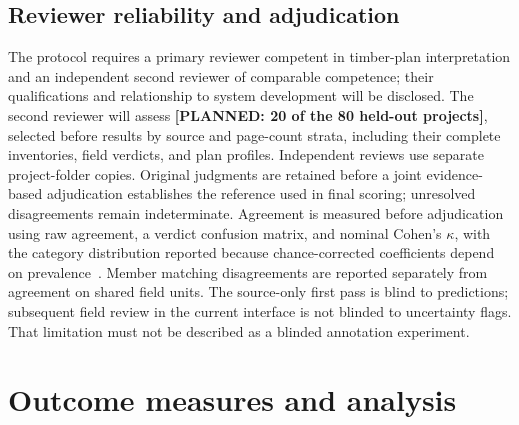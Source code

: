 \documentclass[11pt]{article}
\newcommand{\planned}[1]{\textcolor{blue!65!black}{\textbf{[PLANNED: #1]}}}
\begin{document}
\subsection{Reviewer reliability and adjudication}
The protocol requires a primary reviewer competent in timber-plan interpretation and an independent second reviewer of comparable competence; their qualifications and relationship to system development will be disclosed. The second reviewer will assess \planned{20 of the 80 held-out projects}, selected before results by source and page-count strata, including their complete inventories, field verdicts, and plan profiles. Independent reviews use separate project-folder copies. Original judgments are retained before a joint evidence-based adjudication establishes the reference used in final scoring; unresolved disagreements remain indeterminate. Agreement is measured before adjudication using raw agreement, a verdict confusion matrix, and nominal Cohen's $\kappa$, with the category distribution reported because chance-corrected coefficients depend on prevalence~\cite{artstein2008}. Member matching disagreements are reported separately from agreement on shared field units. The source-only first pass is blind to predictions; subsequent field review in the current interface is not blinded to uncertainty flags. That limitation must not be described as a blinded annotation experiment.

\section{Outcome measures and analysis}
\end{document}

